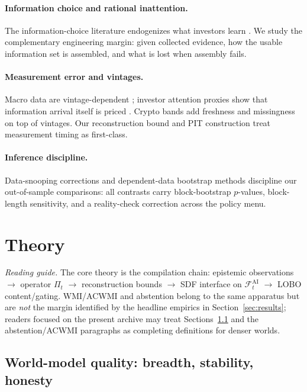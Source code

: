 \documentclass[12pt]{article}
\begin{document}
\paragraph{Information choice and rational inattention.}
The information-choice literature endogenizes what investors learn \citep{sims2003,veldkamp2011}. We study the complementary engineering margin: given collected evidence, how the usable information set is assembled, and what is lost when assembly fails.

\paragraph{Measurement error and vintages.}
Macro data are vintage-dependent \citep{croushore2001}; investor attention proxies show that information arrival itself is priced \citep{da2011}. Crypto bands add freshness and missingness on top of vintages. Our reconstruction bound and PIT construction treat measurement timing as first-class.

\paragraph{Inference discipline.}
Data-snooping corrections \citep{white2000,hansen2005,harvey2016} and dependent-data bootstrap methods \citep{politis1994,ledoit2008} discipline our out-of-sample comparisons: all contrasts carry block-bootstrap $p$-values, block-length sensitivity, and a reality-check correction across the policy menu.

\section{Theory}
\label{sec:theory}

\noindent\textit{Reading guide.} The core theory is the compilation chain: epistemic observations $\rightarrow$ operator $\Pi_t$ $\rightarrow$ reconstruction bounds $\rightarrow$ SDF interface on $\mathcal{F}^{\mathrm{AI}}_t$ $\rightarrow$ LOBO content/gating. WMI/ACWMI and abstention belong to the same apparatus but are \emph{not} the margin identified by the headline empirics in Section~\ref{sec:results}; readers focused on the present archive may treat Sections~\ref{sec:wmi} and the abstention/ACWMI paragraphs as completing definitions for denser worlds.

\subsection{World-model quality: breadth, stability, honesty}
\label{sec:wmi}
\end{document}
